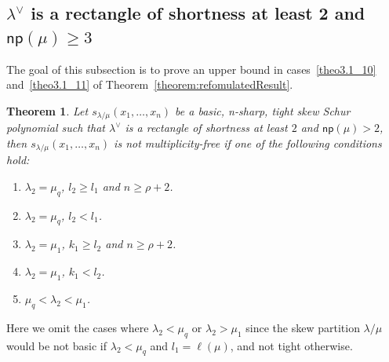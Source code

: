 \documentclass[10pt]{article}
\newtheorem{theorem}{Theorem}[section]
\theoremstyle{definition}
\newcommand{\np}{\mathsf{np}}
\begin{document}
\subsection{\texorpdfstring{$\lambda^\vee$}{lambda vee} is a rectangle of shortness at least 2 and \texorpdfstring{$\np (\mu) \geq 3$}{np(mu) geq 3}}\label{sec:3.2}

The goal of this subsection is to prove an upper bound in cases~\ref{theo3.1_10} and~\ref{theo3.1_11} of Theorem~\ref{theorem:refomulatedResult}.

\begin{theorem}
\label{thm:suffnotfathook}
Let $s_{\lambda/\mu}(x_1,\ldots,x_n)$ be a basic, n-sharp, tight skew Schur polynomial such that $\lambda^\vee$ is a rectangle of shortness at least $2$ and $\np (\mu) > 2$, then $s_{\lambda/\mu}(x_1,\ldots,x_n)$ is not multiplicity-free if one of the following conditions hold:
\begin{enumerate}[label=(\Roman{*})]
 \item\label{theo3.9_1} $\lambda_2 = \mu_q$, $l_2\geq l_1$ and $n\geq \rho+2$.
 \item\label{theo3.9_2} $\lambda_2 = \mu_q$, $l_2< l_1$. 
 \item\label{theo3.9_3} $\lambda_2 = \mu_1$, $k_1\geq l_2$ and $n\geq \rho+2$.
 \item\label{theo3.9_4} $\lambda_2 = \mu_1$, $k_1< l_2$.
 \item\label{theo3.9_5} $\mu_q<\lambda_2<\mu_1$. 
\end{enumerate}
\end{theorem}

Here we omit the cases where $\lambda_2<\mu_q$ or $\lambda_2>\mu_1$ since the skew partition $\lambda/\mu$ would be not basic if $\lambda_2<\mu_q$ and $l_1 = \ell(\mu)$, and not tight otherwise. 
\end{document}
